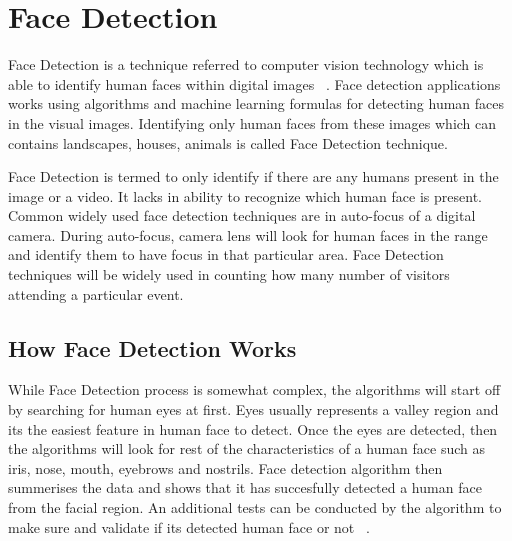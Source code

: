 \documentclass[sigconf]{acmart}
\begin{document}
\section{Face Detection}
Face Detection is a technique referred to computer vision technology which is able to identify human faces within digital images ~\cite{Divya2013}. Face detection applications works using algorithms and machine learning formulas for detecting human faces in the visual images. Identifying only human faces from these images which can contains landscapes, houses, animals is called Face Detection technique.

Face Detection is termed to only identify if there are any humans present in the image or a video. It lacks in ability to recognize which human face is present. Common widely used face detection techniques are in auto-focus of a digital camera. During auto-focus, camera lens will look for human faces in the range and identify them to have focus in that particular area.
Face Detection techniques will be widely used in counting how many number of visitors attending a particular event.

\subsection{How Face Detection Works}
While Face Detection process is somewhat complex, the algorithms will start off by searching for human eyes at first. Eyes usually represents a valley region and its the easiest feature in human face to detect. Once the eyes are detected, then the algorithms will look for rest of the characteristics of a human face such as iris, nose, mouth, eyebrows and nostrils. Face detection algorithm then summerises the data and shows that it has succesfully detected a human face from the facial region. An additional tests can be conducted by the algorithm to make sure and validate if its detected human face or not ~\cite{Jesse2017}.
\end{document}
